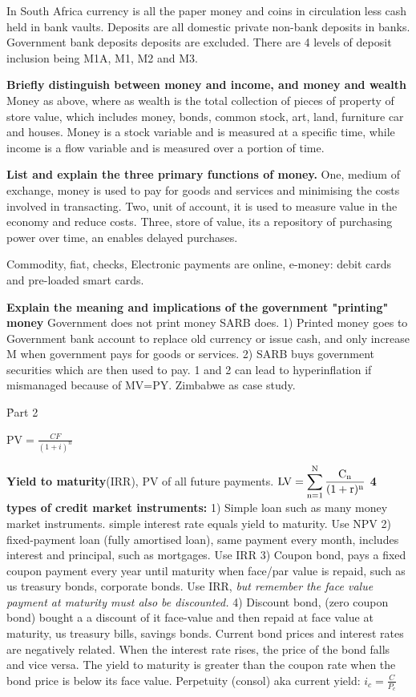 \documentclass[12pt]{examnotes}
\begin{document}
\ra  In South Africa currency is all the paper money and coins in circulation less cash held in bank vaults. 
\ra Deposits are all domestic private non-bank deposits in banks. 
\ra Government bank deposits deposits are excluded. There are 4 levels of deposit inclusion being M1A, M1, M2 and M3.

\textbf{Briefly distinguish between money and income, and money and wealth}
Money as above, where as wealth is the total collection of pieces of property of store value, which includes money, bonds, common stock, art, land, furniture car and houses. Money is a stock variable and is measured at a specific time, while income is a flow variable and is measured over a portion of time.

\textbf{List and explain the three primary functions of money.}
One, medium of exchange, money is used to pay for goods and services and minimising the costs involved in transacting. Two, unit of account, it is used to measure value in the economy and reduce costs. Three, store of value, its a repository of purchasing power over time, an enables delayed purchases.

Commodity, fiat, checks, Electronic payments are online, e-money: debit cards and pre-loaded smart cards. 

\textbf{Explain the meaning and implications of the government "printing" money}
Government does not print money SARB does. 1) Printed money goes to Government bank account to replace old currency or issue cash, and only increase M when government pays for goods or services. 2) SARB buys government securities which are then used to pay. 1 and 2 can lead to hyperinflation if mismanaged because of MV=PY. Zimbabwe as case study.

\h{Part 2}


$\textrm{PV}=\displaystyle\frac{CF}{(1+i)^n}$ \quad

\textbf{Yield to maturity}(IRR), PV of all future payments. $\rm{LV} = \displaystyle\sum_{n=1}^{N} \frac{C_n}{(1+r)^{n}}$ 
\textbf{4 types of credit market instruments:} 
1) Simple loan such as many money market instruments. simple interest rate equals yield to maturity. Use NPV  
2) fixed-payment loan (fully amortised loan), same payment every month, includes interest and principal, such as mortgages. Use IRR 
3) Coupon bond, pays a fixed coupon payment every year until maturity when face/par value is repaid, such as us treasury bonds, corporate bonds. Use IRR, \emph{but remember the face value payment at maturity must also be discounted.}
4) Discount bond, (zero coupon bond) bought a a discount of it face-value and then repaid at face value at maturity, us treasury bills, savings bonds. 
Current bond prices and interest rates are negatively related. When the interest rate rises, the price of the bond falls and vice versa. The yield to  maturity is greater than the coupon rate when the bond price is below its face value. 
Perpetuity (consol) aka current yield: $i_c=\displaystyle\frac{C}{P_c}$ 
\end{document}
